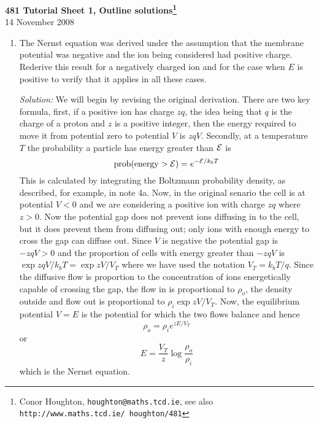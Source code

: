 \documentclass[12pt]{article}
\newcommand\soln{\noindent\textit{Solution:} }
\begin{document}
\begin{center}
{\bf 481 Tutorial Sheet 1, Outline solutions\footnote{Conor Houghton, {\tt houghton@maths.tcd.ie}, see also {\tt http://www.maths.tcd.ie/ houghton/481}}}\\[1cm]{} 14 November 2008
\end{center}

\begin{enumerate}
\item The Nernst equation was derived under the assumption that the
  membrane potential was negative and the ion being considered had
  positive charge. Rederive this result for a negatively charged ion
  and for the case when $E$ is positive to verify that it applies in
  all these cases.

\soln We will begin by revising the original derivation. There are two key formula, first, if a positive ion has charge $zq$, the idea being that $q$ is the charge of a proton and $z$ is a positive integer, then the energy required to move it from potential zero to potential $V$ is $zqV$. Secondly, at a temperature $T$ the probability a particle has energy greater than ${\cal E}$ is
\begin{equation}
\mbox{prob}(\mbox{energy}>{\cal E})=e^{-{\cal E}/k_bT}
\end{equation}
This is calculated by integrating the Boltzmann probability density, as described, for example, in note 4a. Now, in the original senario the cell is at potential $V<0$ and we are considering a positive ion with charge $zq$ where $z>0$. Now the potential gap does not prevent ions diffusing in to the cell, but it does prevent them from diffusing out; only ions with enough energy to cross the gap can diffuse out. Since $V$ is negative the potential gap is $-zqV>0$ and the proportion of cells with energy greater than $-zqV$ is $\exp{zqV/k_bT}=\exp{zV/V_T}$ where we have used the notation $V_T=k_bT/q$. Since the diffusive flow is proportion to the concentration of ions energetically capable of crossing the gap, the flow in is proportional to $\rho_o$, the density outside and flow out is proportional to $\rho_i\exp{zV/V_T}$. Now, the equilibrium potential $V=E$ is the potential for which the two flows balance and hence
\begin{equation}
\rho_o=\rho_ie^{zE/V_T}
\end{equation}
or
\begin{equation}
E=\frac{V_T}{z}\log{\frac{\rho_o}{\rho_i}}
\end{equation}
which is the Nernst equation.


\end{enumerate}
\end{document}
